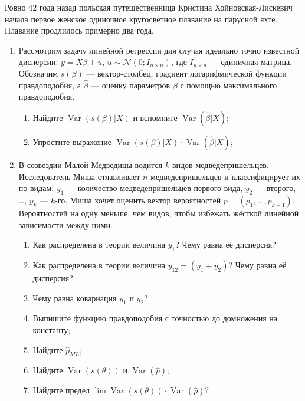 \documentclass[12pt]{article}
\DeclareMathOperator{\Var}{Var}
\def \hb{\hat{\beta}}
\def \cN{\mathcal{N}}
\begin{document}
Ровно 42 года назад польская путешественница Кристина Хойновская-Лискевич начала первое женское одиночное кругосветное плавание на парусной яхте. 
Плавание продлилось примерно два года. 



\begin{enumerate}

  \item Рассмотрим задачу линейной регрессии для случая идеально точно известной дисперсии: $y=X\beta + u$, $u\sim \cN(0; I_{n\times n})$, 
    где $I_{n\times n}$ — единичная матрица. 
    Обозначим $s(\beta)$ — вектор-столбец, градиент логарифмической функции правдоподобия, 
    а $\hb$ — оценку параметров $\beta$ с помощью максимального правдоподобия.

    \begin{enumerate}
      \item Найдите $\Var(s(\beta)|X)$ и вспомните $\Var(\hat\beta|X)$;
      \item Упростите выражение $\Var(s(\beta)|X) \cdot \Var(\hat\beta|X)$;
    \end{enumerate}

  \item В созвездии Малой Медведицы водится $k$ видов медведепришельцев. 
    Исследователь Миша отлавливает $n$ медведепришельцев и классифицирует их по видам: 
    $y_1$ — количество медведепришельцев первого вида, $y_2$ — второго, \ldots, $y_k$ — $k$-го. 
    Миша хочет оценить вектор вероятностей $p=(p_1, \ldots, p_{k-1})$. 
    Вероятностей на одну меньше, чем видов, чтобы избежать жёсткой линейной зависимости между ними.
    \begin{enumerate}
      \item Как распределена в теории величина $y_1$? Чему равна её дисперсия?
      \item Как распределена в теории величина $y_{12}=(y_1 + y_2)$? Чему равна её дисперсия?
      \item Чему равна ковариация $y_1$ и $y_2$?
      \item Выпишите функцию правдоподобия с точностью до домножения на константу;
      \item Найдите $\hat p_{ML}$;
      \item Найдите $\Var(s(\theta))$ и $\Var(\hat p)$;
      \item Найдите предел $\lim \Var(s(\theta)) \cdot \Var(\hat p)$?
    \end{enumerate}

\end{enumerate}
\end{document}
